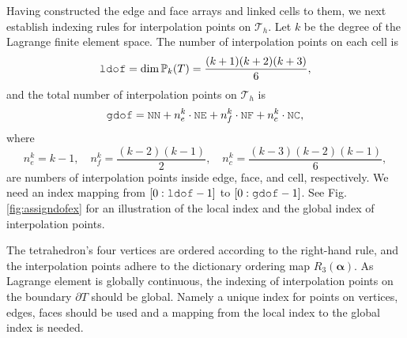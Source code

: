 \documentclass[mathpazo]{cicp}
\begin{document}
Having constructed the edge and face arrays and linked cells to them, we next
establish indexing rules for interpolation points on \(\mathcal T_h\). Let \(k\)
be the degree of the Lagrange finite element space. The number of interpolation
points on each cell is
\[
\mc{ldof} = \dim \mathbb P_k(T) = \frac{(k+1)(k+2)(k+3)}{6},
\]
and the total number of interpolation points on \(\mathcal T_h\) is
\[
\mc{gdof} = \mc{NN} + n_e^k \cdot \mc{NE} + n_f^k \cdot \mc{NF} + n_c^k \cdot \mc{NC},
\]
where
\[
n_e^k = k-1, \quad n_f^k = \frac{(k-2)(k-1)}{2}, \quad n_c^k =
\frac{(k-3)(k-2)(k-1)}{6},
\]
are numbers of interpolation points inside edge, face, and cell, respectively. We need an index mapping from $[0: \mc{ldof}-1]$ to  $[0: \mc{gdof}-1]$. 
See Fig. \ref{fig:assigndofex} for an illustration of the local index and the global index of interpolation points. 



The tetrahedron's four vertices are ordered
according to the right-hand rule, and the interpolation points adhere to the
dictionary ordering map \(R_3(\boldsymbol \alpha)\). As Lagrange
element is globally continuous, the indexing of interpolation points on the boundary $\partial T$ should be global. Namely a unique index for points on vertices, 
edges, faces should be used and a mapping from the local index to the global index is needed. 
\end{document}
